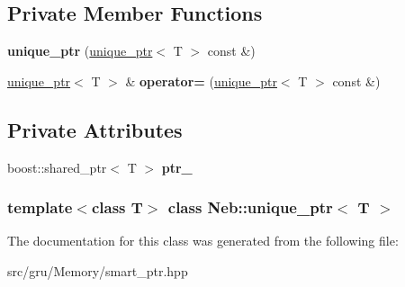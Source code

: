 \subsection*{\-Private \-Member \-Functions}
\begin{DoxyCompactItemize}
\item 
\hypertarget{classNeb_1_1unique__ptr_a79585a3cbcbe213f1a950ecf323691a5}{{\bfseries unique\-\_\-ptr} (\hyperlink{classNeb_1_1unique__ptr}{unique\-\_\-ptr}$<$ \-T $>$ const \&)}\label{classNeb_1_1unique__ptr_a79585a3cbcbe213f1a950ecf323691a5}

\item 
\hypertarget{classNeb_1_1unique__ptr_a8f3c0a31ca5f804867993a1203b31ba6}{\hyperlink{classNeb_1_1unique__ptr}{unique\-\_\-ptr}$<$ \-T $>$ \& {\bfseries operator=} (\hyperlink{classNeb_1_1unique__ptr}{unique\-\_\-ptr}$<$ \-T $>$ const \&)}\label{classNeb_1_1unique__ptr_a8f3c0a31ca5f804867993a1203b31ba6}

\end{DoxyCompactItemize}
\subsection*{\-Private \-Attributes}
\begin{DoxyCompactItemize}
\item 
\hypertarget{classNeb_1_1unique__ptr_aea69c28abf555c29636c736c142c9b2e}{boost\-::shared\-\_\-ptr$<$ \-T $>$ {\bfseries ptr\-\_\-}}\label{classNeb_1_1unique__ptr_aea69c28abf555c29636c736c142c9b2e}

\end{DoxyCompactItemize}
\subsubsection*{template$<$class \-T$>$ class Neb\-::unique\-\_\-ptr$<$ T $>$}



\-The documentation for this class was generated from the following file\-:\begin{DoxyCompactItemize}
\item 
src/gru/\-Memory/smart\-\_\-ptr.\-hpp\end{DoxyCompactItemize}
